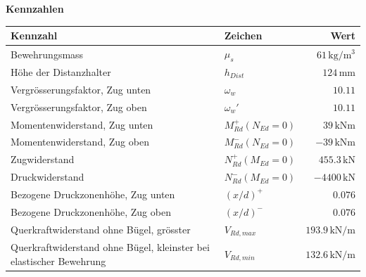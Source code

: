 \documentclass[11pt,a4paper]{article}
\begin{document}
\noindent\textbf{Kennzahlen}
\begin{longtable}{llr}
\hline
Kennzahl & Zeichen & Wert \\
\hline
\endhead
Bewehrungsmass & $\mu_s$ & $61\,\mathrm{kg}/\mathrm{m}^{3}$ \\
Höhe der Distanzhalter & $h_{Dist}$ & $124\,\mathrm{mm}$ \\
Vergrösserungsfaktor, Zug unten & $\omega_w$ & $10.11$ \\
Vergrösserungsfaktor, Zug oben & $\omega_w'$ & $10.11$ \\
Momentenwiderstand, Zug unten & $M_{Rd}^{+}(N_{Ed} = 0)$ & $39\,\mathrm{kNm}$ \\
Momentenwiderstand, Zug oben & $M_{Rd}^{-}(N_{Ed} = 0)$ & $-39\,\mathrm{kNm}$ \\
Zugwiderstand & $N_{Rd}^{+}(M_{Ed} = 0)$ & $455.3\,\mathrm{kN}$ \\
Druckwiderstand & $N_{Rd}^{-}(M_{Ed} = 0)$ & $-4400\,\mathrm{kN}$ \\
Bezogene Druckzonenhöhe, Zug unten & $\left(x/d\right)^{+}$ & $0.076$ \\
Bezogene Druckzonenhöhe, Zug oben & $\left(x/d\right)^{-}$ & $0.076$ \\
Querkraftwiderstand ohne Bügel, grösster & $V_{Rd,max}$ & $193.9\,\mathrm{kN}/\mathrm{m}$ \\
Querkraftwiderstand ohne Bügel, kleinster bei elastischer Bewehrung & $V_{Rd,min}$ & $132.6\,\mathrm{kN}/\mathrm{m}$ \\
\hline
\end{longtable}
\end{document}

